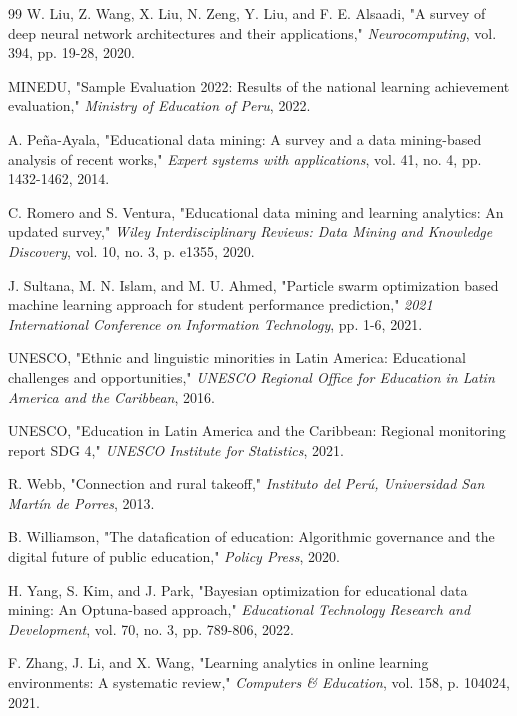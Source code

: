 \documentclass[conference]{IEEEtran}
\begin{document}
\begin{thebibliography}{99}
 W. Liu, Z. Wang, X. Liu, N. Zeng, Y. Liu, and F. E. Alsaadi, "A survey of deep neural network architectures and their applications," \textit{Neurocomputing}, vol. 394, pp. 19-28, 2020.

 MINEDU, "Sample Evaluation 2022: Results of the national learning achievement evaluation," \textit{Ministry of Education of Peru}, 2022.

 A. Peña-Ayala, "Educational data mining: A survey and a data mining-based analysis of recent works," \textit{Expert systems with applications}, vol. 41, no. 4, pp. 1432-1462, 2014.

 C. Romero and S. Ventura, "Educational data mining and learning analytics: An updated survey," \textit{Wiley Interdisciplinary Reviews: Data Mining and Knowledge Discovery}, vol. 10, no. 3, p. e1355, 2020.

 J. Sultana, M. N. Islam, and M. U. Ahmed, "Particle swarm optimization based machine learning approach for student performance prediction," \textit{2021 International Conference on Information Technology}, pp. 1-6, 2021.

 UNESCO, "Ethnic and linguistic minorities in Latin America: Educational challenges and opportunities," \textit{UNESCO Regional Office for Education in Latin America and the Caribbean}, 2016.

 UNESCO, "Education in Latin America and the Caribbean: Regional monitoring report SDG 4," \textit{UNESCO Institute for Statistics}, 2021.

 R. Webb, "Connection and rural takeoff," \textit{Instituto del Perú, Universidad San Martín de Porres}, 2013.

 B. Williamson, "The datafication of education: Algorithmic governance and the digital future of public education," \textit{Policy Press}, 2020.

 H. Yang, S. Kim, and J. Park, "Bayesian optimization for educational data mining: An Optuna-based approach," \textit{Educational Technology Research and Development}, vol. 70, no. 3, pp. 789-806, 2022.

 F. Zhang, J. Li, and X. Wang, "Learning analytics in online learning environments: A systematic review," \textit{Computers \& Education}, vol. 158, p. 104024, 2021.
\end{thebibliography}
\end{document}
